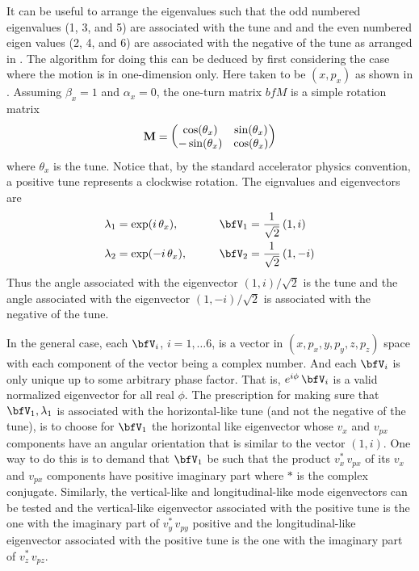 It can be useful to arrange the eigenvalues such that the odd numbered eigenvalues (1, 3, and 5) are
associated with the tune and and the even numbered eigen values (2, 4, and 6) are associated with
the negative of the tune as arranged in . The algorithm for doing this can be deduced by
first considering the case where the motion is in one-dimension only. Here taken to be $(x, p_x)$ as
shown in . Assuming $\beta_x = 1$ and $\alpha_x = 0$, the one-turn matrix $bfM$ is a
simple rotation matrix
\begin{equation}
  {\bf M} = \begin{pmatrix}
    \cos(\theta_x) & \sin(\theta_x) \\
   -\sin(\theta_x) & \cos(\theta_x)
  \end{pmatrix}
\end{equation}
where $\theta_x$ is the tune. Notice that, by the standard accelerator physics convention, a
positive tune represents a clockwise rotation. The eignvalues and
eigenvectors are
\begin{alignat}{2}
  \lambda_1 &= \exp( i \, \theta_x),  \qquad &&\bfV_1 = \frac{1}{\sqrt{2}} \, (1, i) \CRNO
  \lambda_2 &= \exp(-i \, \theta_x),  \qquad &&\bfV_2 = \frac{1}{\sqrt{2}} \, (1, -i) 
\end{alignat}
Thus the angle associated with the eigenvector $(1, i)/\sqrt{2}$ is the tune and the angle
associated with the eigenvector $(1, -i)/\sqrt{2}$ is associated with the negative of the tune.

In the general case, each $\bfV_i$, $i = 1, \ldots 6$, is a vector in $(x, p_x, y, p_y, z, p_z)$
space with each component of the vector being a complex number. And each $\bfV_i$ is only unique up
to some arbitrary phase factor. That is, $e^{i\phi} \, \bfV_i$ is a valid normalized eigenvector for
all real $\phi$.  The prescription for making sure that $\bfV_1, \lambda_1$ is associated with the
horizontal-like tune (and not the negative of the tune), is to choose for $\bfV_1$ the horizontal
like eigenvector whose $v_x$ and $v_{px}$ components have an angular orientation that is similar to
the vector $(1, i)$. One way to do this is to demand that $\bfV_1$ be such that the product $v_x^*
\, v_{px}$ of its $v_x$ and $v_{px}$ components have positive imaginary part where $*$ is the
complex conjugate. Similarly, the vertical-like and longitudinal-like mode eigenvectors can be
tested and the vertical-like eigenvector associated with the positive tune is the one with the
imaginary part of $v_y^* \, v_{py}$ positive and the longitudinal-like eigenvector associated with
the positive tune is the one with the imaginary part of $v_z^* \, v_{pz}$.

